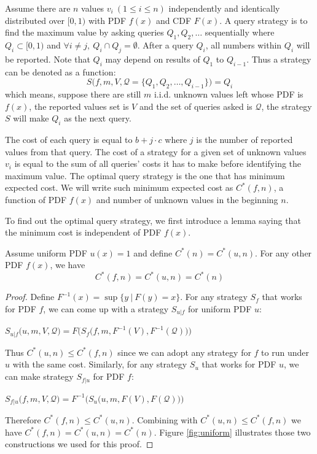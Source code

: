 \begin{definition}\label{def:query}

Assume there are $n$ values $v_i ~(1 \leq i \leq n)$ independently and
identically distributed over $[0, 1)$ with PDF $f(x)$ and CDF $F(x)$.  A query
strategy is to find the maximum value by asking queries $Q_1, Q_2, \ldots$
sequentially where $Q_i \subset [0, 1)$ and $\forall i \neq j, ~Q_i \cap Q_j =
\emptyset$.  After a query $Q_i$, all numbers within $Q_i$ will be reported.
Note that $Q_i$ may depend on results of $Q_1$ to $Q_{i-1}$. Thus a
strategy can be denoted as a function:
\begin{displaymath}
	S\big(f, m, V, \mathcal Q = \{Q_1, Q_2, \ldots, Q_{i-1} \}\big) = Q_i
\end{displaymath}
which means, suppose there are still $m$ i.i.d. unknown values left whose PDF
is $f(x)$, the reported values set is $V$ and the set of queries asked is
$\mathcal Q$, the strategy $S$ will make $Q_i$ as the next query.

The cost of each query is equal to $b+j \cdot c$ where $j$ is the number of
reported values from that query. The cost of a strategy for a given set of
unknown values $v_i$ is equal to the sum of all queries' costs it has to make
before identifying the maximum value. The optimal query strategy is the one
that has minimum expected cost.  We will write such minimum expected cost as
$C^*(f, n)$, a function of PDF $f(x)$ and number of unknown values in the
beginning $n$.

\end{definition}

To find out the optimal query strategy, we first introduce
a lemma saying that the minimum cost is independent of PDF $f(x)$.

\begin{lemma}\label{lemma:uniform}

Assume uniform PDF $u(x) = 1$ and define $C^*(n) = C^*(u, n)$.
For any other PDF $f(x)$, we have 
\[C^*(f, n) = C^*(u, n) = C^*(n)\]

\end{lemma}

\begin{proof}

Define $F^{-1}(x) = \sup\{y ~|~ F(y) = x\}$. For any strategy $S_f$ that works
for PDF $f$, we can come up with a strategy $S_{u|f}$ for uniform PDF $u$:

$
S_{u|f}\big(u, m, V, \mathcal Q \big) = F\Big( S_f\big( f, m, F^{-1}(V), F^{-1} (\mathcal Q) \big) \Big)
$

Thus $C^*(u, n) \leq C^*(f, n)$ since we can adopt any strategy for $f$ to run
under $u$ with the same cost.  Similarly, for any strategy $S_u$ that works for
PDF $u$, we can make strategy $S_{f|u}$ for PDF $f$:

$
S_{f|u}\big(f, m, V, \mathcal Q \big) = F^{-1}\Big( S_u\big( u, m, F(V), F (\mathcal Q) \big) \Big)
$

Therefore $C^*(f, n) \leq C^*(u, n)$. Combining with $C^*(u, n) \leq C^*(f, n)$
we have $C^*(f, n) = C^*(u, n) = C^*(n)$. Figure \ref{fig:uniform} 
illustrates those two constructions we used for this proof.

\end{proof}

